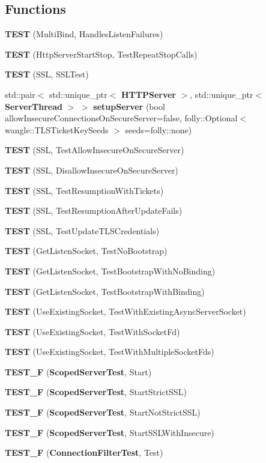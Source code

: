 \subsection*{Functions}
\begin{DoxyCompactItemize}
\item 
{\bf T\+E\+ST} (Multi\+Bind, Handles\+Listen\+Failures)
\item 
{\bf T\+E\+ST} (Http\+Server\+Start\+Stop, Test\+Repeat\+Stop\+Calls)
\item 
{\bf T\+E\+ST} (S\+SL, S\+S\+L\+Test)
\item 
std\+::pair$<$ std\+::unique\+\_\+ptr$<$ {\bf H\+T\+T\+P\+Server} $>$, std\+::unique\+\_\+ptr$<$ {\bf Server\+Thread} $>$ $>$ {\bf setup\+Server} (bool allow\+Insecure\+Connections\+On\+Secure\+Server=false, folly\+::\+Optional$<$ wangle\+::\+T\+L\+S\+Ticket\+Key\+Seeds $>$ seeds=folly\+::none)
\item 
{\bf T\+E\+ST} (S\+SL, Test\+Allow\+Insecure\+On\+Secure\+Server)
\item 
{\bf T\+E\+ST} (S\+SL, Disallow\+Insecure\+On\+Secure\+Server)
\item 
{\bf T\+E\+ST} (S\+SL, Test\+Resumption\+With\+Tickets)
\item 
{\bf T\+E\+ST} (S\+SL, Test\+Resumption\+After\+Update\+Fails)
\item 
{\bf T\+E\+ST} (S\+SL, Test\+Update\+T\+L\+S\+Credentials)
\item 
{\bf T\+E\+ST} (Get\+Listen\+Socket, Test\+No\+Bootstrap)
\item 
{\bf T\+E\+ST} (Get\+Listen\+Socket, Test\+Bootstrap\+With\+No\+Binding)
\item 
{\bf T\+E\+ST} (Get\+Listen\+Socket, Test\+Bootstrap\+With\+Binding)
\item 
{\bf T\+E\+ST} (Use\+Existing\+Socket, Test\+With\+Existing\+Async\+Server\+Socket)
\item 
{\bf T\+E\+ST} (Use\+Existing\+Socket, Test\+With\+Socket\+Fd)
\item 
{\bf T\+E\+ST} (Use\+Existing\+Socket, Test\+With\+Multiple\+Socket\+Fds)
\item 
{\bf T\+E\+S\+T\+\_\+F} ({\bf Scoped\+Server\+Test}, Start)
\item 
{\bf T\+E\+S\+T\+\_\+F} ({\bf Scoped\+Server\+Test}, Start\+Strict\+S\+SL)
\item 
{\bf T\+E\+S\+T\+\_\+F} ({\bf Scoped\+Server\+Test}, Start\+Not\+Strict\+S\+SL)
\item 
{\bf T\+E\+S\+T\+\_\+F} ({\bf Scoped\+Server\+Test}, Start\+S\+S\+L\+With\+Insecure)
\item 
{\bf T\+E\+S\+T\+\_\+F} ({\bf Connection\+Filter\+Test}, Test)
\end{DoxyCompactItemize}


